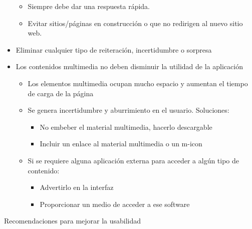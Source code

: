 \documentclass[12pt, twoside, openright]{report} %
\begin{document}
\begin{itemize}
\begin{itemize}
      \item
        Siempre debe dar una respuesta rápida.
      \item
        Evitar sitios/páginas en construcción o que no redirigen al
        nuevo sitio web.
      \end{itemize}
    \item
      Eliminar cualquier tipo de reiteración, incertidumbre o sorpresa
    \item
      Los contenidos multimedia no deben disminuir la utilidad de la
      aplicación

      \begin{itemize}
      
      \item
        Los elementos multimedia ocupan mucho espacio y aumentan el
        tiempo de carga de la página
      \item
        Se genera incertidumbre y aburrimiento en el usuario.
        Soluciones:

        \begin{itemize}
        
        \item
          No embeber el material multimedia, hacerlo descargable
        \item
          Incluir un enlace al material multimedia o un m-icon
        \end{itemize}
      \item
        Si se requiere alguna aplicación externa para acceder a algún
        tipo de contenido:

        \begin{itemize}
        
        \item
          Advertirlo en la interfaz
        \item
          Proporcionar un medio de acceder a ese software
        \end{itemize}
      \end{itemize}
    \end{itemize}
    \pagebreak
    Recomendaciones para mejorar la usabilidad
\end{document}
